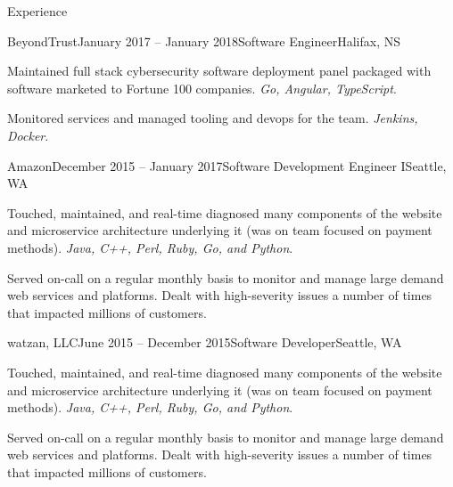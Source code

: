 \documentclass{resume} %
\begin{document}

\begin{rSection}{Experience}

\begin{rSubsection}{BeyondTrust}{January 2017 -- January 2018}{Software Engineer}{Halifax, NS}
\item Maintained full stack cybersecurity software deployment panel packaged with software marketed to Fortune 100 companies. \textit{Go, Angular, TypeScript}.
\item Monitored services and managed tooling and devops for the team. \textit{Jenkins, Docker}.  
\end{rSubsection}


\begin{rSubsection}{Amazon}{December 2015 -- January 2017}{Software Development Engineer I}{Seattle, WA}
\item Touched, maintained, and real-time diagnosed many components of the website and microservice architecture underlying it (was on team focused on payment methods). \textit{Java, C++, Perl, Ruby, Go, and Python}.
\item Served on-call on a regular monthly basis to monitor and manage large demand web services and platforms. Dealt with high-severity issues a number of times that impacted millions of customers.
\end{rSubsection}

\end{rSection}


\begin{rSubsection}{watzan, LLC}{June 2015 -- December 2015}{Software Developer}{Seattle, WA}
\item Touched, maintained, and real-time diagnosed many components of the website and microservice architecture underlying it (was on team focused on payment methods). \textit{Java, C++, Perl, Ruby, Go, and Python}.
\item Served on-call on a regular monthly basis to monitor and manage large demand web services and platforms. Dealt with high-severity issues a number of times that impacted millions of customers.
\end{rSubsection}
\end{document}
